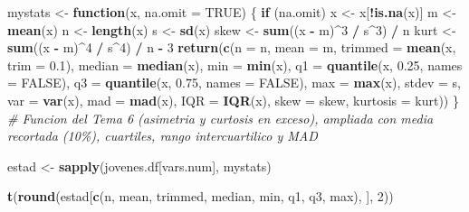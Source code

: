 \documentclass[water,article,submit,pdftex,moreauthors]{Definitions/mdpi}
\newenvironment{Shaded}{\begin{snugshade}}{\end{snugshade}}
\newcommand{\AttributeTok}[1]{\textcolor[rgb]{0.13,0.29,0.53}{#1}}
\newcommand{\CommentTok}[1]{\textcolor[rgb]{0.56,0.35,0.01}{\textit{#1}}}
\newcommand{\ConstantTok}[1]{\textcolor[rgb]{0.56,0.35,0.01}{#1}}
\newcommand{\ControlFlowTok}[1]{\textcolor[rgb]{0.13,0.29,0.53}{\textbf{#1}}}
\newcommand{\DecValTok}[1]{\textcolor[rgb]{0.00,0.00,0.81}{#1}}
\newcommand{\FloatTok}[1]{\textcolor[rgb]{0.00,0.00,0.81}{#1}}
\newcommand{\FunctionTok}[1]{\textcolor[rgb]{0.13,0.29,0.53}{\textbf{#1}}}
\newcommand{\NormalTok}[1]{#1}
\newcommand{\OtherTok}[1]{\textcolor[rgb]{0.56,0.35,0.01}{#1}}
\newcommand{\SpecialCharTok}[1]{\textcolor[rgb]{0.81,0.36,0.00}{\textbf{#1}}}
\newcommand{\StringTok}[1]{\textcolor[rgb]{0.31,0.60,0.02}{#1}}
\begin{document}
\begin{Shaded}
\begin{Highlighting}[]
\NormalTok{mystats }\OtherTok{\textless{}{-}} \ControlFlowTok{function}\NormalTok{(x, }\AttributeTok{na.omit =} \ConstantTok{TRUE}\NormalTok{) \{}
  \ControlFlowTok{if}\NormalTok{ (na.omit) x }\OtherTok{\textless{}{-}}\NormalTok{ x[}\SpecialCharTok{!}\FunctionTok{is.na}\NormalTok{(x)]}
\NormalTok{  m }\OtherTok{\textless{}{-}} \FunctionTok{mean}\NormalTok{(x)}
\NormalTok{  n }\OtherTok{\textless{}{-}} \FunctionTok{length}\NormalTok{(x)}
\NormalTok{  s }\OtherTok{\textless{}{-}} \FunctionTok{sd}\NormalTok{(x)}
\NormalTok{  skew }\OtherTok{\textless{}{-}} \FunctionTok{sum}\NormalTok{((x }\SpecialCharTok{{-}}\NormalTok{ m)}\SpecialCharTok{\^{}}\DecValTok{3} \SpecialCharTok{/}\NormalTok{ s}\SpecialCharTok{\^{}}\DecValTok{3}\NormalTok{) }\SpecialCharTok{/}\NormalTok{ n}
\NormalTok{  kurt }\OtherTok{\textless{}{-}} \FunctionTok{sum}\NormalTok{((x }\SpecialCharTok{{-}}\NormalTok{ m)}\SpecialCharTok{\^{}}\DecValTok{4} \SpecialCharTok{/}\NormalTok{ s}\SpecialCharTok{\^{}}\DecValTok{4}\NormalTok{) }\SpecialCharTok{/}\NormalTok{ n }\SpecialCharTok{{-}} \DecValTok{3}
  \FunctionTok{return}\NormalTok{(}\FunctionTok{c}\NormalTok{(}\AttributeTok{n =}\NormalTok{ n, }\AttributeTok{mean =}\NormalTok{ m, }\AttributeTok{trimmed =} \FunctionTok{mean}\NormalTok{(x, }\AttributeTok{trim =} \FloatTok{0.1}\NormalTok{), }\AttributeTok{median =} \FunctionTok{median}\NormalTok{(x), }\AttributeTok{min =} \FunctionTok{min}\NormalTok{(x), }\AttributeTok{q1 =} \FunctionTok{quantile}\NormalTok{(x, }\FloatTok{0.25}\NormalTok{, }\AttributeTok{names =} \ConstantTok{FALSE}\NormalTok{), }\AttributeTok{q3 =} \FunctionTok{quantile}\NormalTok{(x, }\FloatTok{0.75}\NormalTok{, }\AttributeTok{names =} \ConstantTok{FALSE}\NormalTok{), }\AttributeTok{max =} \FunctionTok{max}\NormalTok{(x), }\AttributeTok{stdev =}\NormalTok{ s, }\AttributeTok{var =} \FunctionTok{var}\NormalTok{(x), }\AttributeTok{mad =} \FunctionTok{mad}\NormalTok{(x), }\AttributeTok{IQR =} \FunctionTok{IQR}\NormalTok{(x), }\AttributeTok{skew =}\NormalTok{ skew, }\AttributeTok{kurtosis =}\NormalTok{ kurt))}
\NormalTok{\}}
\CommentTok{\# Funcion del Tema 6 (asimetria y curtosis en exceso), ampliada con media recortada (10\%), cuartiles, rango intercuartilico y MAD}

\NormalTok{estad }\OtherTok{\textless{}{-}} \FunctionTok{sapply}\NormalTok{(jovenes.df[vars.num], mystats)}

\FunctionTok{t}\NormalTok{(}\FunctionTok{round}\NormalTok{(estad[}\FunctionTok{c}\NormalTok{(}\StringTok{\textquotesingle{}n\textquotesingle{}}\NormalTok{, }\StringTok{\textquotesingle{}mean\textquotesingle{}}\NormalTok{, }\StringTok{\textquotesingle{}trimmed\textquotesingle{}}\NormalTok{, }\StringTok{\textquotesingle{}median\textquotesingle{}}\NormalTok{, }\StringTok{\textquotesingle{}min\textquotesingle{}}\NormalTok{, }\StringTok{\textquotesingle{}q1\textquotesingle{}}\NormalTok{, }\StringTok{\textquotesingle{}q3\textquotesingle{}}\NormalTok{, }\StringTok{\textquotesingle{}max\textquotesingle{}}\NormalTok{), ], }\DecValTok{2}\NormalTok{))}
\end{Highlighting}
\end{Shaded}
\end{document}
